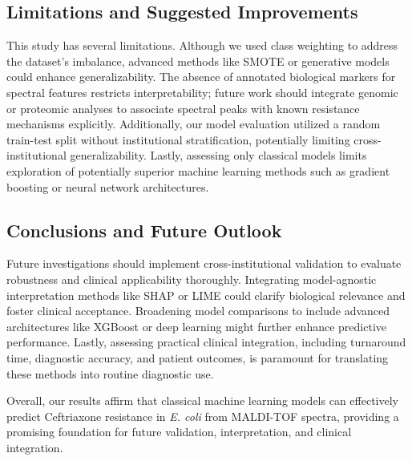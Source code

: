 \documentclass{article}
\begin{document}
\subsection{Limitations and Suggested Improvements}

This study has several limitations. Although we used class weighting to address the dataset's imbalance, advanced methods like SMOTE or generative models could enhance generalizability. The absence of annotated biological markers for spectral features restricts interpretability; future work should integrate genomic or proteomic analyses to associate spectral peaks with known resistance mechanisms explicitly. Additionally, our model evaluation utilized a random train-test split without institutional stratification, potentially limiting cross-institutional generalizability. Lastly, assessing only classical models limits exploration of potentially superior machine learning methods such as gradient boosting or neural network architectures.

\subsection{Conclusions and Future Outlook}

Future investigations should implement cross-institutional validation to evaluate robustness and clinical applicability thoroughly. Integrating model-agnostic interpretation methods like SHAP or LIME could clarify biological relevance and foster clinical acceptance. Broadening model comparisons to include advanced architectures like XGBoost or deep learning might further enhance predictive performance. Lastly, assessing practical clinical integration, including turnaround time, diagnostic accuracy, and patient outcomes, is paramount for translating these methods into routine diagnostic use.

Overall, our results affirm that classical machine learning models can effectively predict Ceftriaxone resistance in \textit{E. coli} from MALDI-TOF spectra, providing a promising foundation for future validation, interpretation, and clinical integration.






\end{document}
